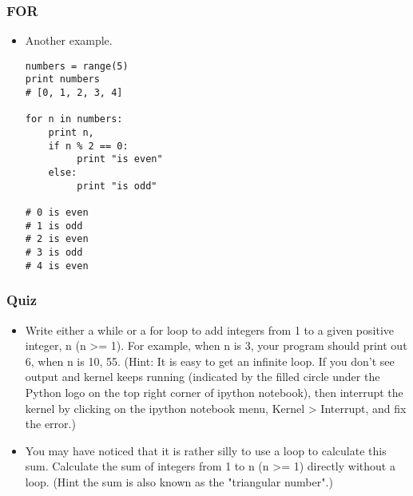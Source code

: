 \documentclass{beamer}
\begin{document}
\begin{frame}[fragile]
\frametitle{FOR}
\begin{itemize}
\item Another example.
\begin{lstlisting}
numbers = range(5)
print numbers
# [0, 1, 2, 3, 4]

for n in numbers:
    print n,
    if n % 2 == 0:
         print "is even"
    else:
         print "is odd" 

# 0 is even
# 1 is odd
# 2 is even
# 3 is odd
# 4 is even      
\end{lstlisting}
\end{itemize}
\end{frame}

\begin{frame}[fragile]
\frametitle{Quiz}
\begin{itemize}
\item Write either a while or a for loop to add integers from 1 to
    a given positive integer, n (n >= 1). For example, when n is 3,
    your program should print out 6, when n is 10, 55.
    (Hint: It is easy to get an infinite loop. If you don't see
    output and kernel keeps running (indicated by the filled circle
    under the Python logo on the top right corner of ipython notebook),
    then interrupt the kernel by clicking on the ipython notebook
    menu, Kernel > Interrupt, and fix the error.)
\item You may have noticed that it is rather silly to use a loop
    to calculate this sum. Calculate the sum of integers from 1
    to n (n >= 1) directly without a loop. (Hint the sum is also
    known as the "triangular number".)
\end{itemize}
\end{frame}
\end{document}
